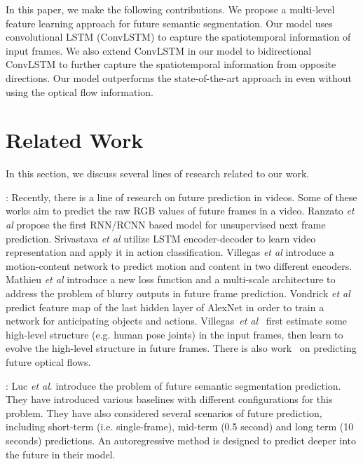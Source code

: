 \documentclass{bmvc2k}
\def\etal{\emph{et al}\bmvaOneDot}
\begin{document}
In this paper, we make the following contributions. We propose a multi-level feature learning approach for future semantic segmentation. Our model uses convolutional LSTM (ConvLSTM) to capture the spatiotemporal information of input frames. We also extend ConvLSTM in our model to bidirectional ConvLSTM to further capture the spatiotemporal information from opposite directions. Our model outperforms the state-of-the-art approach in \cite{jin2017predicting} even without using the optical flow information.

\section{Related Work}\label{sec:related}%

In this section, we discuss several lines of research related to our work.

: Recently, there is a line of research on future prediction in videos. Some of these works aim to predict the raw RGB values of future frames in a video. Ranzato \etal\cite{ranzato2014video} propose the first RNN/RCNN based model for unsupervised next frame prediction.  Srivastava \etal\cite{srivastava2015unsupervised} utilize LSTM \cite{hochreiter1997long} encoder-decoder to learn video representation and apply it in action classification. Villegas \etal\cite{villegas17mcnet} introduce a motion-content network to predict motion and content in two different encoders. Mathieu \etal\cite{mathieu2015deep} introduce a new loss function and a multi-scale architecture to address the problem of blurry outputs in future frame prediction. Vondrick \etal\cite{Vondrick_2016_CVPR} predict feature map of the last hidden layer of AlexNet \cite{krizhevsky2012imagenet} in order to train a network for anticipating objects and actions. Villegas~\etal~\cite{villegas2017learning} first estimate some high-level structure (e.g. human pose joints) in the input frames, then learn to evolve the high-level structure in future frames. There is also work~\cite{walker2015dense,PatrauceanHC16} on predicting future optical flows.

: Luc \etal. \cite{NextSegmPredICCV17} introduce the problem of future semantic segmentation prediction. They have introduced various baselines with different configurations for this problem. They have also considered several scenarios of future prediction, including short-term (i.e. single-frame), mid-term (0.5 second) and long term (10 seconds) predictions. An autoregressive method is designed to predict deeper into the future in their model. %
\end{document}

